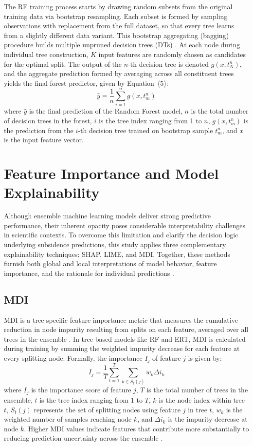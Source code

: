 \documentclass[oneside,doublespacing,flushright]{lsuthesis}
\begin{document}
The RF training process starts by drawing random subsets from the original training data via bootstrap resampling. Each subset is formed by sampling observations with replacement from the full dataset, so that every tree learns from a slightly different data variant.
 This bootstrap aggregating (bagging) procedure builds multiple unpruned decision trees (DTs) \citep{Breiman2017, Breiman1996Bagging}. At each node during individual tree construction, $K$ input features are randomly chosen as candidates for the optimal split. 
 The output of the $n$-th decision tree is denoted $g(x, t_N^n)$, and the aggregate prediction formed by averaging across all constituent trees yields the final forest predictor, given by Equation~(5):
\begin{equation}
\hat{y} = \frac{1}{n} \sum_{i=1}^{n} g(x, t_m^n)
\end{equation}
where $\hat{y}$ is the final prediction of the Random Forest model, $n$ is the total number of decision trees in the forest, $i$ is the tree index ranging from 1 to $n$, $g(x, t_m^n)$ is the prediction from the $i$-th decision tree trained on bootstrap sample $t_m^n$, and $x$ is the input feature vector.

\section{Feature Importance and Model Explainability}
Although ensemble machine learning models deliver strong predictive performance, their inherent opacity poses 
considerable interpretability challenges in scientific contexts. To overcome this limitation and clarify 
the decision logic underlying subsidence predictions, this study applies three complementary explainability techniques: 
SHAP, LIME, and MDI. Together, these methods furnish both global and local interpretations of model behavior, feature importance, and the rationale for individual predictions \citep{Lundberg2017,yu_explainable_2025}.


\subsection{MDI}
MDI is a tree-specific feature importance metric that measures the cumulative reduction in node impurity resulting from splits on each feature, averaged over all trees in the ensemble \citep{Breiman2001}. In tree-based models like RF and ERT, MDI is calculated during training by summing the weighted impurity decrease for each feature at every splitting node. Formally, the importance $I_j$ of feature $j$ is given by:
\begin{equation}
I_j = \frac{1}{T} \sum_{t=1}^{T} \sum_{k \in S_t(j)} w_k \Delta i_k
\end{equation}
where $I_j$ is the importance score of feature $j$, $T$ is the total number of trees in the ensemble, $t$ is the tree index ranging from 1 to $T$, $k$ is the node index within tree $t$, $S_t(j)$ represents the set of splitting nodes using feature $j$ in tree $t$, $w_k$ is the weighted number of samples reaching node $k$, and $\Delta i_k$ is the impurity decrease at node $k$. Higher MDI values indicate features that contribute more substantially to reducing prediction uncertainty across the ensemble \citep{Cutler2007}.
\end{document}
